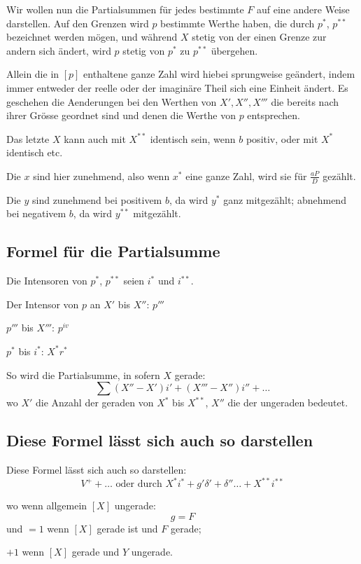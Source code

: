 \documentclass[12pt,a4paper]{article}
\begin{document}
Wir wollen nun die Partialsummen für jedes bestimmte $F$ auf eine andere Weise darstellen. Auf den Grenzen wird $p$ bestimmte Werthe haben, die durch $p^*$, $p^{**}$ bezeichnet werden mögen, und während $X$ stetig von der einen Grenze zur andern sich ändert, wird $p$ stetig von $p^*$ zu $p^{**}$ übergehen.

Allein die in $[p]$ enthaltene ganze Zahl wird hiebei sprungweise geändert, indem immer entweder der reelle oder der imaginäre Theil sich eine Einheit ändert. Es geschehen die Aenderungen bei den Werthen von $X', X'', X'''$ die bereits nach ihrer Grösse geordnet sind und denen die Werthe von $p$ entsprechen.

Das letzte $X$ kann auch mit $X^{**}$ identisch sein, wenn $b$ positiv, oder mit $X^*$ identisch etc.

Die $x$ sind hier zunehmend, also wenn $x^*$ eine ganze Zahl, wird sie für $\frac{aP}{D}$ gezählt.

Die $y$ sind zunehmend bei positivem $b$, da wird $y^*$ ganz mitgezählt; abnehmend bei negativem $b$, da wird $y^{**}$ mitgezählt.

\subsection*{Formel für die Partialsumme}

Die Intensoren von $p^*$, $p^{**}$ seien $i^*$ und $i^{**}$.

Der Intensor von $p$ an $X'$ bis $X''$: $p'''$

$p'''$ bis $X'''$: $p^{iv}$

$p^*$ bis $i^*$: $X^*r^*$

So wird die Partialsumme, in sofern $X$ gerade:
\[
\sum (X'' - X')i' + (X''' - X'')i'' + \ldots
\]
wo $X'$ die Anzahl der geraden von $X^*$ bis $X^{**}$, $X''$ die der ungeraden bedeutet.

\subsection*{Diese Formel lässt sich auch so darstellen}

Diese Formel lässt sich auch so darstellen:
\[
V^+ + \ldots \text{ oder durch } X^*i^* + g'\delta' + \delta'' \ldots + X^{**}i^{**}
\]

wo wenn allgemein $[X]$ ungerade:
\[
g = F
\]
und $=1$ wenn $[X]$ gerade ist und $F$ gerade;

$+1$ wenn $[X]$ gerade und $Y$ ungerade.
\end{document}
